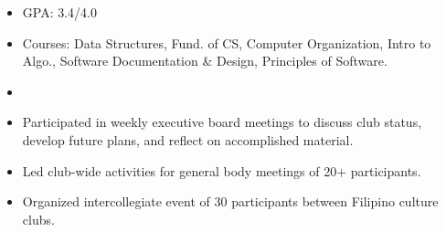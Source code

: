 






\begin{itemize}
\item GPA: 3.4/4.0
\item Courses: Data Structures, Fund. of CS, Computer Organization, Intro to Algo., Software Documentation \& Design, Principles of Software.
\end{itemize}

\begin{itemize}
\item
\end{itemize}

\begin{itemize}
\item Participated in weekly executive board meetings to discuss club status, develop future plans, and reflect on accomplished material.
\item Led club-wide activities for general body meetings of 20+ participants.
\item Organized intercollegiate event of 30 participants between Filipino culture clubs.
\end{itemize}


